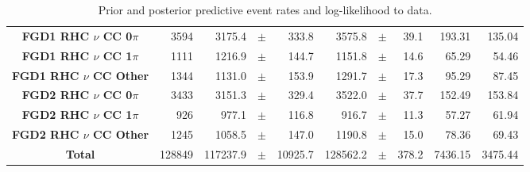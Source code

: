 \begin{center}
\begin{table}[!htbp]
\begin{adjustbox}{max width=1.1\textwidth,center}
\begin{tabular}{S||
	  			r|
                r
                p{0.26cm}
                r
                |r
                p{0.26cm}
                r
                |r
                r}
\textbf{FGD1 RHC $\nu$ CC 0$\pi$} & 3594 & 3175.4 & $\pm$ & 333.8 & 3575.8 & $\pm$ & 39.1 & 193.31 & 135.04\\
\textbf{FGD1 RHC $\nu$ CC 1$\pi$} & 1111 & 1216.9 & $\pm$ & 144.7 & 1151.8 & $\pm$ & 14.6 & 65.29 & 54.46\\
\textbf{FGD1 RHC $\nu$ CC Other} & 1344 & 1131.0 & $\pm$ & 153.9 & 1291.7 & $\pm$ & 17.3 & 95.29 & 87.45\\ \hline
\textbf{FGD2 RHC $\nu$ CC 0$\pi$} & 3433 & 3151.3 & $\pm$ & 329.4 & 3522.0 & $\pm$ & 37.7 & 152.49 & 153.84\\
\textbf{FGD2 RHC $\nu$ CC 1$\pi$} & 926 & 977.1 & $\pm$ & 116.8 & 916.7 & $\pm$ & 11.3 & 57.27 & 61.94\\
\textbf{FGD2 RHC $\nu$ CC Other} & 1245 & 1058.5 & $\pm$ & 147.0 & 1190.8 & $\pm$ & 15.0 & 78.36 & 69.43 \\ \hline
\textbf{Total} & 128849 & 117237.9 & $\pm$ & 10925.7 & 128562.2 & $\pm$ & 378.2 & 7436.15 & 3475.44 \\ \hline\hline
\end{tabular}
\end{adjustbox}
\caption{Prior and posterior predictive event rates and log-likelihood to data.}
\label{tab:predrates}
\end{table}
\end{center}

